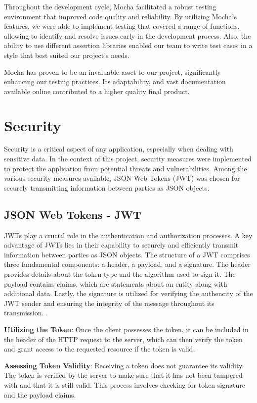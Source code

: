 Throughout the development cycle, Mocha facilitated a robust testing environment that improved code quality and reliability. By utilizing Mocha's features, we were able to 
implement testing that covered a range of functions, allowing to identify and resolve issues early in the development process. 
Also, the ability to use different assertion libraries enabled our team to write test cases in a style that best suited our project's needs.

Mocha has proven to be an invaluable asset to our project, significantly enhancing our testing practices. Its adaptability, and vast documentation available online contributed 
to a higher quality final product.



\section{Security}
Security is a critical aspect of any application, especially when dealing with sensitive data. In the context of this project, security measures were implemented 
to protect the application from potential threats and vulnerabilities. Among the various security measures available, JSON Web Tokens (JWT) was chosen for securely
transmitting information between parties as JSON objects. 

\subsection{JSON Web Tokens - JWT}

JWTs play a crucial role in the authentication and authorization processes. A key advantage of JWTs lies in their capability to securely and efficiently transmit information
between parties as JSON objects. 
The structure of a JWT comprises three fundamental components: a header, a payload, and a signature. The header provides details about the token type and the algorithm used to sign it.
The payload contains claims, which are statements about an entity along with additional data. Lastly, the signature is utilized for verifying the authencity of the JWT sender
and ensuring the integrity of the message throughout its transmission. \cite{jwt}.

\textbf{Utilizing the Token}: Once the client possesses the token, it can be included in the header of the HTTP request to the server, which can then verify 
the token and grant access to the requested resource if the token is valid.

\textbf{Assessing Token Validity}: Receiving a token does not guarantee its validity. The token is verified by the server to make sure that it has not been tampered with
and that it is still valid. This process involves checking for token signature and the payload claims. 

